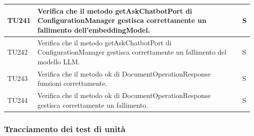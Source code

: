 \documentclass[10pt, a4paper]{article}
\begin{document}
\begin{xltabular}{\textwidth}{p{0.12\textwidth}|p{0.7\textwidth}|X}
\hline
TU241 & Verifica che il metodo getAskChatbotPort di ConfigurationManager gestisca correttamente un fallimento dell'embeddingModel. & S \\
\hline
TU242 & Verifica che il metodo getAskChatbotPort di ConfigurationManager gestisca correttamente un fallimento del modello LLM. & S \\
\hline
TU243 & Verifica che il metodo ok di DocumentOperationResponse funzioni correttamente. & S \\
\hline
TU244 & Verifica che il metodo ok di DocumentOperationResponse gestisca correttamente un fallimento. & S \\
\hline


\end{xltabular}

\subsubsection{Tracciamento dei test di unità} 
\renewcommand{\arraystretch}{1.5}
\end{document}

